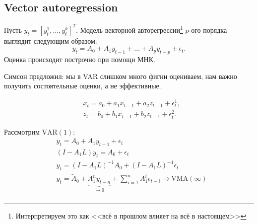     \subsection{Vector autoregression}
        \begin{definition}
            Пусть $y_t = [y^1_t, \dots, y^k_t]^T$. Модель векторной авторегрессии\footnote{Интерпретируем это как <<всё в прошлом влияет на всё в настоящем>>} $p$-ого порядка выглядит следующим образом:
            \begin{equation}
                y_t = A_0 + A_1y_{t-1}+ \dots + A_py_{t-p} + \epsilon_t.
            \end{equation}
            Оценка происходит построчно при помощи МНК.
        \end{definition}
        Симсон предложил: мы в VAR слишком много фигни оцениваем, нам важно получить состоятельные оценки, а не эффективные.
        \begin{example}
            \begin{align}
                & x_t = a_0 + a_1 x_{t-1} + a_2 z_{t-1} + \epsilon^1_t, \\
                & z_t = b_0 + b_1 x_{t-1} + b_2 z_{t-1} + \epsilon^2_t.
            \end{align}
        \end{example}
        Рассмотрим $\mathrm{VAR}(1)$:
        \begin{align*}
            & y_t = A_0 + A_1y_{t-1} + \epsilon_t\\
            & (I - A_1L) y_t = A_0 + \epsilon_t\\
            &  y_t = (I - A_1L)^{-1}A_0 + (I - A_1L)^{-1}\epsilon_t\\
            &  y_t = \widetilde A_0 + \underbrace{A_1^n y_{t-n}}_{\to 0} + \sum_{i=1}^n A_1^i \epsilon_{t-i} \to \mathrm{VMA}(\infty)\\
        \end{align*}

        